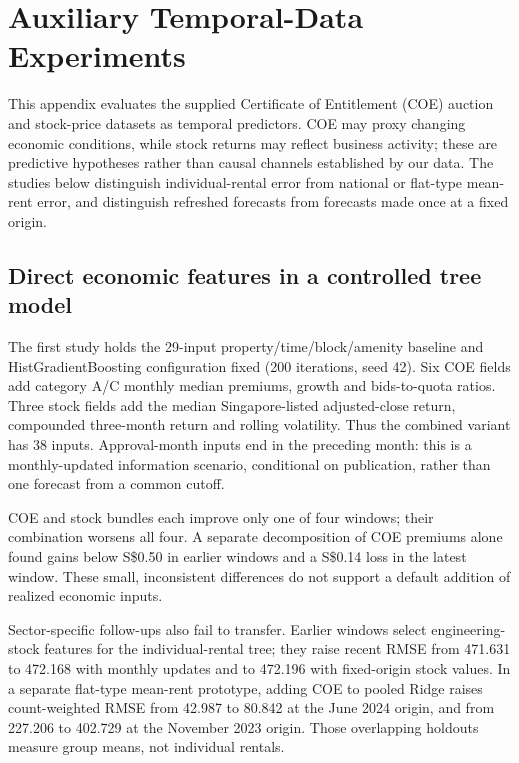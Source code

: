 \documentclass[conference]{IEEEtran}
\newcommand{\sgd}{S\$}
\begin{document}
\section{Auxiliary Temporal-Data Experiments}\label{app:auxiliarytemporal}
\begingroup\small
This appendix evaluates the supplied Certificate of Entitlement (COE) auction and stock-price datasets as temporal predictors. COE may proxy changing economic conditions, while stock returns may reflect business activity; these are predictive hypotheses rather than causal channels established by our data. The studies below distinguish individual-rental error from national or flat-type mean-rent error, and distinguish refreshed forecasts from forecasts made once at a fixed origin.

\subsection{Direct economic features in a controlled tree model}
The first study holds the 29-input property/time/block/amenity baseline and HistGradientBoosting configuration fixed (200 iterations, seed 42). Six COE fields add category A/C monthly median premiums, growth and bids-to-quota ratios. Three stock fields add the median Singapore-listed adjusted-close return, compounded three-month return and rolling volatility. Thus the combined variant has 38 inputs. Approval-month inputs end in the preceding month: this is a monthly-updated information scenario, conditional on publication, rather than one forecast from a common cutoff.

\begin{table}[!ht]
\caption{Direct auxiliary-feature ablation: individual-rental RMSE (SGD). Expanding-window validation ends in December 2022, June 2023, March 2024 and March 2025, respectively. Feature counts are in parentheses. Each row compares identical fitting/validation records and model settings.}
\label{tab:auxdirect}
\centering\small

\end{table}

COE and stock bundles each improve only one of four windows; their combination worsens all four. A separate decomposition of COE premiums alone found gains below \sgd0.50 in earlier windows and a \sgd0.14 loss in the latest window. These small, inconsistent differences do not support a default addition of realized economic inputs.

Sector-specific follow-ups also fail to transfer. Earlier windows select engineering-stock features for the individual-rental tree; they raise recent RMSE from 471.631 to 472.168 with monthly updates and to 472.196 with fixed-origin stock values. In a separate flat-type mean-rent prototype, adding COE to pooled Ridge raises count-weighted RMSE from 42.987 to 80.842 at the June 2024 origin, and from 227.206 to 402.729 at the November 2023 origin. Those overlapping holdouts measure group means, not individual rentals.
\end{document}
